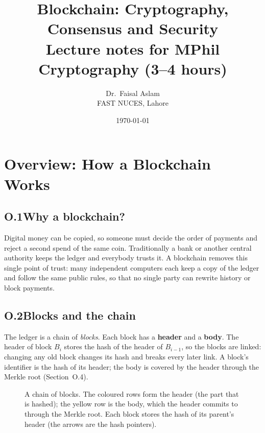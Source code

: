 \documentclass[11pt,a4paper]{article}
\title{\textbf{Blockchain: Cryptography, Consensus and Security}\\[2mm]
\large Lecture notes for MPhil Cryptography (3--4 hours)}
\author{Dr.\ Faisal Aslam\\ FAST NUCES, Lahore}
\date{\today}
\theoremstyle{definition}
\theoremstyle{plain}
\theoremstyle{remark}
\newcommand{\Hash}{\mathsf{H}}
\begin{document}
\maketitle
\tableofcontents
\newpage

\section*{Overview: How a Blockchain Works}
\small
\setlength{\parskip}{0.3em}
\setlength{\abovecaptionskip}{3pt}

\subsection*{O.1\quad Why a blockchain?}
Digital money can be copied, so someone must decide the order of payments and reject a second spend of the same coin. Traditionally a bank or another central authority keeps the ledger and everybody trusts it. A blockchain removes this single point of trust: many independent computers each keep a copy of the ledger and follow the same public rules, so that no single party can rewrite history or block payments.

\subsection*{O.2\quad Blocks and the chain}
The ledger is a chain of \emph{blocks}. Each block has a \textbf{header} and a \textbf{body}. The header of block $B_i$ stores the hash of the header of $B_{i-1}$, so the blocks are linked: changing any old block changes its hash and breaks every later link. A block's identifier is the hash of its header; the body is covered by the header through the Merkle root (Section~O.4).

\begin{figure}[htbp]
\centering
{}
\caption{A chain of blocks. The coloured rows form the header (the part that is hashed); the yellow row is the body, which the header commits to through the Merkle root. Each block stores the hash of its parent's header (the arrows are the hash pointers).}
\end{figure}
\end{document}
